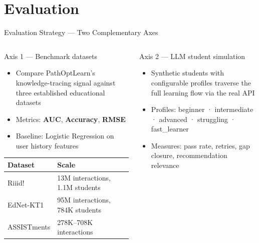 \documentclass[aspectratio=169,12pt]{beamer}
\begin{document}
\section{Evaluation}

\begin{frame}{Evaluation Strategy — Two Complementary Axes}
  \begin{columns}
      \begin{block}{Axis 1 — Benchmark datasets}
        \begin{itemize}\small
          \item Compare PathOptLearn's knowledge-tracing signal
                against three established educational datasets
          \item Metrics: \textbf{AUC}, \textbf{Accuracy}, \textbf{RMSE}
          \item Baseline: Logistic Regression on user history features
        \end{itemize}
        \vspace{4pt}
        {\footnotesize\begin{tabular}{ll}
          \toprule
          Dataset & Scale \\
          \midrule
          Riiid!      & 13M interactions, 1.1M students \\
          EdNet-KT1   & 95M interactions, 784K students \\
          ASSISTments & 278K–708K interactions \\
          \bottomrule
        \end{tabular}}
      \end{block}
      \begin{block}{Axis 2 — LLM student simulation}
        \begin{itemize}\small
          \item Synthetic students with configurable profiles
                traverse the full learning flow via the real API
          \item Profiles: beginner · intermediate · advanced ·
                struggling · fast\_learner
          \item Measures: pass rate, retries, gap closure,
                recommendation relevance
        \end{itemize}
      \end{block}

\end{columns}
\end{frame}
\end{document}
